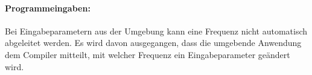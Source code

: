 \documentclass[twoside,a4paper,fleqn,12pt]{book}
\begin{document}

\paragraph{Programmeingaben:}
Bei Eingabeparametern aus der Umgebung kann eine Frequenz nicht automatisch abgeleitet werden.
Es wird davon ausgegangen, dass die umgebende Anwendung dem Compiler mitteilt, mit welcher Frequenz ein Eingabeparameter
geändert wird.\\


\end{document}
